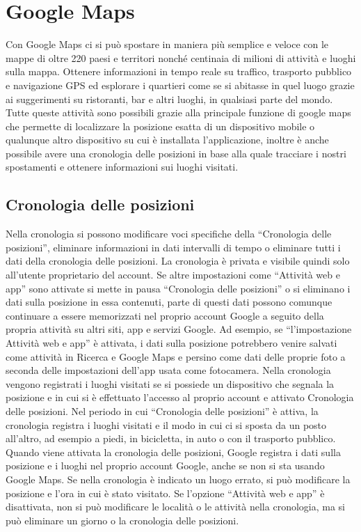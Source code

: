 \documentclass[]{scrartcl}
\begin{document}
\section{Google Maps}
Con Google Maps ci si può spostare in maniera più semplice e veloce con le mappe di oltre 220 paesi e territori nonché centinaia di milioni di attività e luoghi sulla mappa. Ottenere informazioni in tempo reale su traffico, trasporto pubblico e navigazione GPS ed esplorare i quartieri come se si abitasse in quel luogo grazie ai suggerimenti su ristoranti, bar e altri luoghi, in qualsiasi parte del mondo. 
Tutte queste attività sono possibili grazie alla principale funzione di google maps che permette di localizzare la posizione esatta di un dispositivo mobile o qualunque altro dispositivo su cui è installata l’applicazione, inoltre è anche possibile avere una cronologia delle posizioni in base alla quale tracciare i nostri spostamenti e ottenere informazioni sui luoghi visitati.
\subsection{Cronologia delle posizioni}
Nella cronologia si possono modificare voci specifiche della “Cronologia delle posizioni”, eliminare informazioni in dati intervalli di tempo o eliminare tutti i dati della cronologia delle posizioni. La cronologia è privata e visibile quindi solo all'utente proprietario del account.
Se altre impostazioni come “Attività web e app” sono attivate si mette in pausa “Cronologia delle posizioni” o si eliminano i dati sulla posizione in essa contenuti, parte di questi dati possono comunque continuare a essere memorizzati nel proprio account Google a seguito della propria attività su altri siti, app e servizi Google. Ad esempio, se “l'impostazione Attività web e app” è attivata, i dati sulla posizione potrebbero venire salvati come attività in Ricerca e Google Maps e persino come dati delle proprie foto a seconda delle impostazioni dell'app usata come fotocamera.
Nella cronologia vengono registrati i luoghi visitati se si possiede un dispositivo che segnala la posizione e in cui si è effettuato l'accesso al proprio account e attivato Cronologia delle posizioni.
Nel periodo in cui “Cronologia delle posizioni” è attiva, la cronologia registra i luoghi visitati e il modo in cui ci si sposta da un posto all'altro, ad esempio a piedi, in bicicletta, in auto o con il trasporto pubblico.
Quando viene attivata la cronologia delle posizioni, Google registra i dati sulla posizione e i luoghi nel proprio account Google, anche se non si sta usando Google Maps.
Se nella cronologia è indicato un luogo errato, si può modificare la posizione e l'ora in cui è stato visitato. Se l'opzione “Attività web e app” è disattivata, non si può modificare le località o le attività nella cronologia, ma si può eliminare un giorno o la cronologia delle posizioni.
\end{document}
